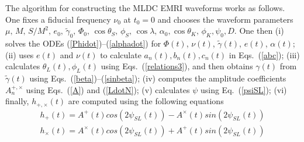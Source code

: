 \documentclass[12pt]{iopart}
\begin{document}
The algorithm for constructing the MLDC EMRI waveforms works as follows. One fixes a fiducial frequency $\nu_0$ at $t_0 = 0$ and chooses the waveform parameters $\mu,\, M,\,S/M^2,\,e_0,\,\tilde\gamma_0,\,\Phi_0,\,\cos\theta_S,\,\phi_S,\,\cos\lambda,\,\alpha_0,\cos\theta_K,\,\phi_K,\psi_0,D$. One then (i) solves the ODEs (\ref{Phidot})--(\ref{alphadot}) for $\Phi(t)$, $\nu(t)$, $\tilde\gamma(t)$, $e(t)$, $\alpha(t)$; (ii) uses $e(t)$ and $\nu(t)$ to calculate $a_n(t), b_n(t), c_n(t)$ in Eqs.~(\ref{abc}); (iii) calculates $\theta_L(t),\phi_L(t)$ using Eqs.~(\ref{relations3}), and then obtains $\gamma(t)$ from $\tilde\gamma(t)$ using Eqs.~(\ref{beta})--(\ref{sinbeta}); (iv) computes the amplitude coefficients $A_n^{+,\times}$  using Eqs.~(\ref{A}) and (\ref{LdotN}); (v) calculates $\psi$ using Eq.~(\ref{psiSL}); (vi) finally,  $h_{+,\times}(t)$ are computed using the following equations
\begin{eqnarray}\label{final}
h_+(t) = A^+(t) cos(2\psi_{SL}(t) ) - A^{\times}(t) sin(2\psi_{SL}(t) ) \nonumber \\
h_{\times}(t) = A^{\times}(t) cos(2\psi_{SL}(t) ) + A^+(t) sin(2\psi_{SL}(t) )
\end{eqnarray}
\end{document}
